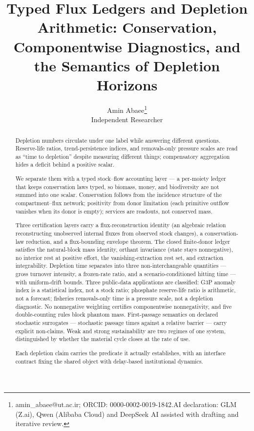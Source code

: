 \documentclass[11pt]{article}
\begin{document}
\title{Typed Flux Ledgers and Depletion Arithmetic: Conservation, Componentwise Diagnostics, and the Semantics of Depletion Horizons}
\author{Amin Abaee\thanks{amin\_abaee@ut.ac.ir; ORCID: 0000-0002-0019-1842.\newline AI declaration: GLM (Z.ai), Qwen (Alibaba Cloud) and DeepSeek AI assisted with drafting and iterative review.} \\ Independent Researcher}
\date{}
\maketitle

\begin{abstract}


Depletion numbers circulate under one label while answering different
questions. Reserve-life ratios, trend-persistence indices, and
removals-only pressure scales are read as ``time to depletion'' despite
measuring different things; compensatory aggregation hides a deficit
behind a positive scalar.

We separate them with a typed stock--flow accounting layer --- a
per-moiety ledger that keeps conservation laws typed, so biomass, money,
and biodiversity are not summed into one scalar. Conservation follows
from the incidence structure of the compartment--flux network;
positivity from donor limitation (each primitive outflow vanishes when
its donor is empty); services are readouts, not conserved mass.

Three certification layers carry a flux-reconstruction identity (an
algebraic relation reconstructing unobserved internal fluxes from
observed stock changes), a conservation-law reduction, and a
flux-bounding envelope theorem. The closed finite-donor ledger satisfies
the natural-block mass identity, orthant invariance (state stays
nonnegative), no interior rest at positive effort, the
vanishing-extraction rest set, and extraction integrability. Depletion
time separates into three non-interchangeable quantities --- gross
turnover intensity, a frozen-rate ratio, and a scenario-conditioned
hitting time --- with uniform-drift bounds. Three public-data
applications are classified: G3P anomaly index is a statistical index,
not a stock ratio; phosphate reserve-life ratio is arithmetic, not a
forecast; fisheries removals-only time is a pressure scale, not a
depletion diagnostic. No nonnegative weighting certifies componentwise
nonnegativity, and five double-counting rules block phantom mass.
First-passage semantics on declared stochastic surrogates --- stochastic
passage times against a relative barrier --- carry explicit non-claims.
Weak and strong sustainability are two regimes of one system,
distinguished by whether the material cycle closes at the rate of use.

Each depletion claim carries the predicate it actually establishes, with
an interface contract fixing the shared object with delay-based
institutional dynamics.

\end{abstract}
\end{document}
